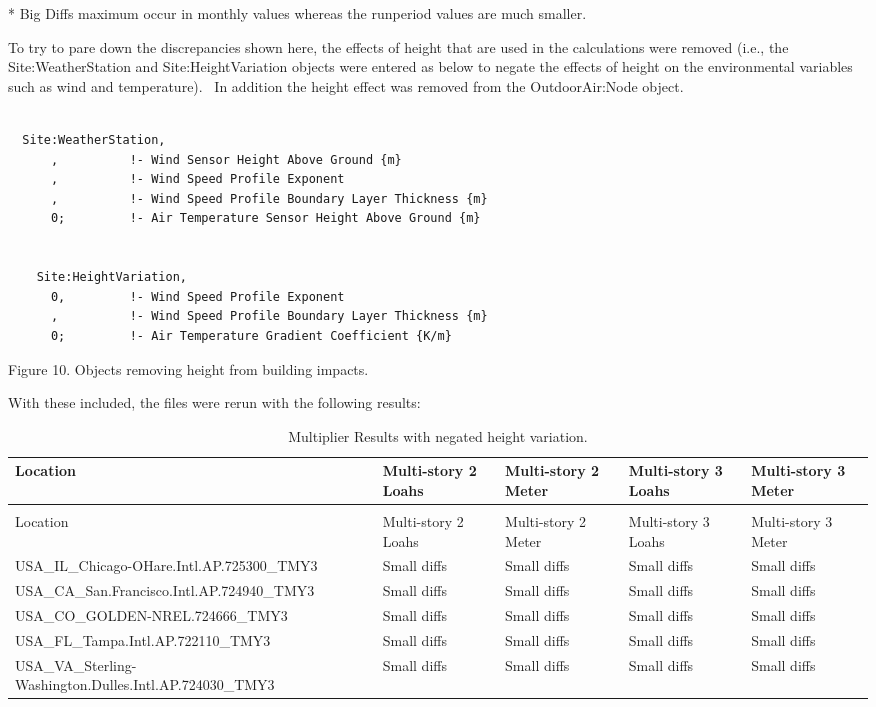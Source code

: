 * Big Diffs maximum occur in monthly values whereas the runperiod values are much smaller.

To try to pare down the discrepancies shown here, the effects of height that are used in the calculations were removed (i.e., the Site:WeatherStation and Site:HeightVariation objects were entered as below to negate the effects of height on the environmental variables such as wind and temperature).~ In addition the height effect was removed from the OutdoorAir:Node object.

\begin{lstlisting}

  Site:WeatherStation,
      ,          !- Wind Sensor Height Above Ground {m}
      ,          !- Wind Speed Profile Exponent
      ,          !- Wind Speed Profile Boundary Layer Thickness {m}
      0;         !- Air Temperature Sensor Height Above Ground {m}


    Site:HeightVariation,
      0,         !- Wind Speed Profile Exponent
      ,          !- Wind Speed Profile Boundary Layer Thickness {m}
      0;         !- Air Temperature Gradient Coefficient {K/m}
\end{lstlisting}

Figure 10. Objects removing height from building impacts.

With these included, the files were rerun with the following results:

\begin{longtable}[c]{p{1.2in}p{1.2in}p{1.2in}p{1.2in}p{1.2in}}
\caption{Multiplier Results with negated height variation. \label{table:multiplier-results-with-negated-height}} \tabularnewline
\toprule 
Location & Multi-story 2 Loahs & Multi-story 2 Meter & Multi-story 3 Loahs & Multi-story 3 Meter \tabularnewline
\midrule
\endfirsthead

\caption[]{Multiplier Results with negated height variation.} \tabularnewline
\toprule 
Location & Multi-story 2 Loahs & Multi-story 2 Meter & Multi-story 3 Loahs & Multi-story 3 Meter \tabularnewline
\midrule
\endhead

USA\_IL\_Chicago-OHare.Intl.AP.725300\_TMY3 & Small diffs & Small diffs & Small diffs & Small diffs \tabularnewline
USA\_CA\_San.Francisco.Intl.AP.724940\_TMY3 & Small diffs & Small diffs & Small diffs & Small diffs \tabularnewline
USA\_CO\_GOLDEN-NREL.724666\_TMY3 & Small diffs & Small diffs & Small diffs & Small diffs \tabularnewline
USA\_FL\_Tampa.Intl.AP.722110\_TMY3 & Small diffs & Small diffs & Small diffs & Small diffs \tabularnewline
USA\_VA\_Sterling-Washington.Dulles.Intl.AP.724030\_TMY3 & Small diffs & Small diffs & Small diffs & Small diffs \tabularnewline
\bottomrule
\end{longtable}


